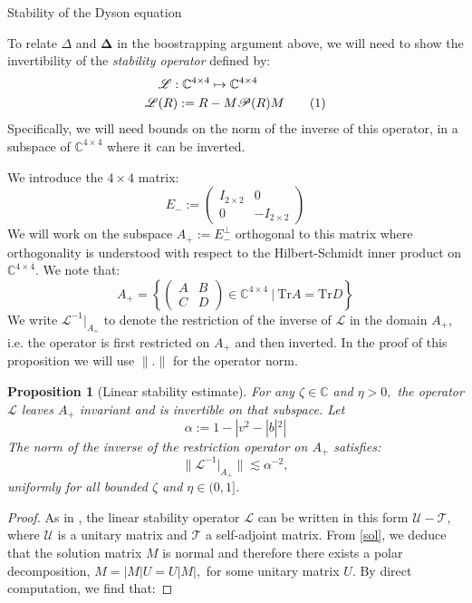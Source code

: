 \documentclass[11pt, a4paper, oneside]{book}
\numberwithin{equation}{chapter}
\newcommand{\beq}{\begin{equation}}
\newcommand{\eeq}{\end{equation}}
\newcommand\numberthis{\addtocounter{equation}{1}\tag{\theequation}}
\newtheorem{prop}[thm]{Proposition}
\begin{document}
\begin{section}{Stability of the Dyson equation} \label{s:stability}

To relate $\Delta$ and $\mathbf{\Delta}$ in the boostrapping argument above, we will need to show the invertibility of the \textit{stability operator} defined by:
%
\begin{align*} \label{stabop} 
&\mathscr{L}: \mathbb{C}^{4 \times 4} \mapsto \mathbb{C}^{4 \times 4} \\
\mathscr{L} &(R) := R - M \mathscr{P}(R) M \numberthis
\end{align*}
%
Specifically, we will need bounds on the norm of the inverse of this operator, in a subspace of $\mathbb{C}^{4 \times 4}$ where it can be inverted.

We introduce the $4 \times 4$ matrix:
%
\[
E_- :=  \begin{pmatrix}
I_{2 \times 2} & {0} \\ {0} & - I_{2 \times 2} \end{pmatrix}
\]
%
We will work on the subspace $A_+ := E_{-}^{\perp}$ orthogonal to this matrix where orthogonality is understood with respect to the Hilbert-Schmidt inner product on $\mathbb{C}^{4 \times 4}.$ We note that:
\[
A_+ = \left \{ \begin{pmatrix}
    A & B \\ C & D
\end{pmatrix} \in \mathbb{C}^{4\times 4} \ \bigg | \ \mathrm{Tr}A = \mathrm{Tr}D \right \}
\]
We write $\mathscr{L}^{-1} |_{A_+}$ to denote the restriction of the inverse of  $\mathscr{L}$ in the domain $A_+$, i.e. the operator is first restricted on $A_+$ and then inverted. In the proof of this proposition we will use $\|.\|$ for the operator norm.
%
\begin{prop}[Linear stability estimate] \label{stab-est1} For any $\zeta \in \mathbb{C}$ and $\eta >0 ,$ the operator $ \mathscr{L}$ leaves $A_+$ invariant and is invertible on that subspace. Let
\begin{equation}\label{alpha}
\alpha := 1 - |v^2 - |b|^2|
\end{equation}
The norm of the inverse of the restriction operator on $A_+$ satisfies:
\beq \label{stabest1}
\| \mathscr{L}^{-1} |_{A_+} \| \lesssim \alpha^{-2},
\eeq
uniformly for all bounded $\zeta$ and $\eta \in (0,1]$.
\end{prop}
%
\begin{proof}
As in \cite{alt2022local}, the linear stability operator $\mathscr{L}$ can be written in this form $\mathcal{U}-\mathcal{T},$ where $\mathcal{U}$ is a unitary matrix and $\mathcal{T}$ a self-adjoint matrix. From \eqref{sol}, we deduce that the solution matrix $M$ is normal and therefore there exists a polar decomposition, $M=|M|U=U|M|,$ for some unitary matrix $U.$ By direct computation, we find that:

\end{proof}
\end{section}
\end{document}
